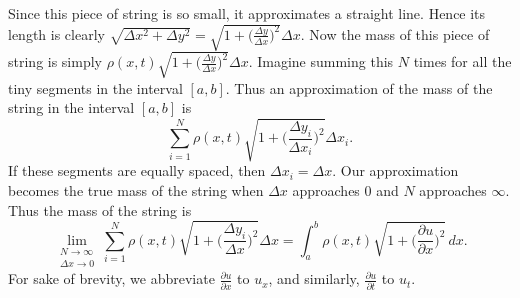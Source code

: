 \documentclass{amsart}
\begin{document}
  Since this piece of string is so small, it approximates a straight line. Hence its length is clearly $\sqrt{\Delta x^2 + \Delta y^2} = \sqrt{1 + \big(\frac{\Delta y}{\Delta x}\big)^2}\Delta x$. Now the mass of this piece of string is simply $\rho(x, t)\sqrt{1 + \big(\frac{\Delta y}{\Delta x}\big)^2}\Delta x$. Imagine summing this $N$ times for all the tiny segments in the interval $[a, b]$. Thus an approximation of the mass of the string  in the interval $[a, b]$ is \[
    \sum_{i=1}^{N} \rho(x, t)\sqrt{1 + \Big(\frac{\Delta y_i}{\Delta x_i}\Big)^2}\Delta x_i
  .\] If these segments are equally spaced, then $\Delta x_i = \Delta x$. Our approximation becomes the true mass of the string when  $\Delta x$ approaches 0 and $N$ approaches $\infty$. Thus the mass of the string is \[
  \lim_{\substack{N \to \infty \\ \Delta x \to 0}} \sum_{i=1}^{N} \rho(x, t)\sqrt{1 + \Big(\frac{\Delta y_i}{\Delta x}\Big)^2}\Delta x = \int_{a}^{b} \rho(x, t)\sqrt{1 + \Big(\frac{\partial u}{\partial x}\Big)^2}\, dx
.\] For sake of brevity, we abbreviate $\frac{\partial u}{\partial x}$ to  $u_x$, and similarly, $\frac{\partial u}{\partial t}$ to $u_t$.
\end{document}

